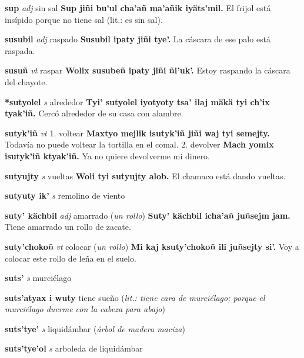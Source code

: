 \documentclass[10pt]{scrbook}
\newcommand{\entry}[1]{\textbf{#1}}
\newcommand{\onedefinition}[1]{#1.}
\newcommand{\partofspeech}[1]{\textit{#1}}
\newcommand{\spanishtranslation}[1]{#1}
\newcommand{\clarification}[1]{(\textit{#1})}
\newcommand{\cholexample}[1]{\textbf{#1}}
\newcommand{\exampletranslation}[1]{#1}
\begin{document}
\begin{multicols}{2}
\entry{sup}
\partofspeech{adj}
\spanishtranslation{sin sal}
\cholexample{Sup jiñi bu'ul cha'añ ma'añik iyäts'mil.}
\exampletranslation{El frijol está insípido porque no tiene sal (lit.: es sin sal).}

\entry{susubil}
\partofspeech{adj}
\spanishtranslation{raspado}
\cholexample{Susubil ipaty jiñi tye'.}
\exampletranslation{La cáscara de ese palo está raspada.}

\entry{susuñ}
\partofspeech{vt}
\spanishtranslation{raspar}
\cholexample{Wolix susubeñ ipaty jiñi ñi'uk'.}
\exampletranslation{Estoy raspando la cáscara del chayote.}

\entry{*sutyolel}
\partofspeech{s}
\spanishtranslation{alrededor}
\cholexample{Tyi' sutyolel iyotyoty tsa' ilaj mäkä tyi ch'ix tyak'iñ.}
\exampletranslation{Cercó alrededor de su casa con alambre.}

\entry{sutyk'iñ}
\partofspeech{vt}
\onedefinition{1}
\spanishtranslation{voltear}
\cholexample{Maxtyo mejlik isutyk'iñ jiñi waj tyi semejty.}
\exampletranslation{Todavía no puede voltear la tortilla en el comal.}
\onedefinition{2}
\spanishtranslation{devolver}
\cholexample{Mach yomix isutyk'iñ ktyak'iñ.}
\exampletranslation{Ya no quiere devolverme mi dinero.}

\entry{sutyujty}
\partofspeech{s}
\spanishtranslation{vueltas}
\cholexample{Woli tyi sutyujty alob.}
\exampletranslation{El chamaco está dando vueltas.}

\entry{sutyuty ik'}
\partofspeech{s}
\spanishtranslation{remolino de viento}

\entry{suty' kächbil}
\partofspeech{adj}
\spanishtranslation{amarrado}
\clarification{un rollo}
\cholexample{Suty' kächbil icha'añ juñsejm jam.}
\exampletranslation{Tiene amarrado un rollo de zacate.}

\entry{suty'chokoñ}
\partofspeech{vt}
\spanishtranslation{colocar}
\clarification{un rollo}
\cholexample{Mi kaj ksuty'chokoñ ili juñsejty si'.}
\exampletranslation{Voy a colocar este rollo de leña en el suelo.}

\entry{suts'}
\partofspeech{s}
\spanishtranslation{murciélago}

\entry{suts'atyax i wuty}
\spanishtranslation{tiene sueño}
\clarification{lit.: tiene cara de murciélago; porque el murciélago duerme con la cabeza para abajo}

\entry{suts'tye'}
\partofspeech{s}
\spanishtranslation{liquidámbar}
\clarification{árbol de madera maciza}

\entry{suts'tye'ol}
\partofspeech{s}
\spanishtranslation{arboleda de liquidámbar}


\end{multicols}
\end{document}
